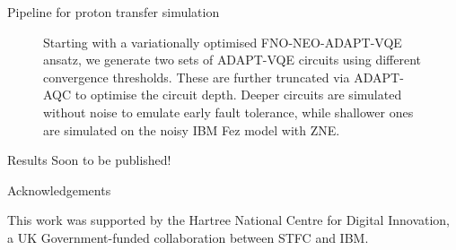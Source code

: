 \documentclass[final,hyperref={pdfpagelabels=false},mathserif]{beamer}
\begin{document}
\begin{columns}[t]
\begin{column}{40cm}
\begin{block}{Pipeline for proton transfer simulation}
\begin{figure}[ht]
\begin{center}

\end{center}

\caption{Starting with a variationally optimised \gls{FNO}-\gls{NEO}-\gls{ADAPT-VQE} ansatz, we generate two sets of \gls{ADAPT-VQE} circuits using different convergence thresholds. These are further truncated via \gls{ADAPT-AQC} to optimise the circuit depth. Deeper circuits are simulated without noise to emulate early fault tolerance, while shallower ones are simulated on the noisy IBM Fez model with \gls{ZNE}.}
\label{fig:neo-fno-adapt-vqe}
\end{figure}


\end{block}

\begin{block}
{Results}
\centering
Soon to be published!

\end{block}

%
%
\begin{block}
{Acknowledgements}

This work was supported by the Hartree National Centre for Digital Innovation, a UK Government-funded collaboration between STFC and IBM.
\end{block}


\end{column}
\end{columns}
\end{document}
